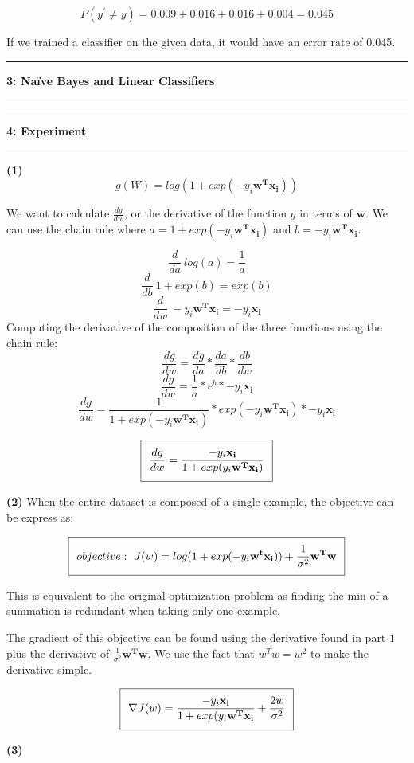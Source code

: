 \documentclass[11pt]{article}
\newcommand\question[2]{\vspace{.25in}\hrule\textbf{#1: #2}\vspace{.5em}\hrule\vspace{.10in}}
\renewcommand\part[1]{\vspace{.10in}\textbf{(#1)}}
\begin{document}
$$P(y^\prime \neq y) = 0.009 + 0.016 + 0.016 + 0.004 = 0.045$$

If we trained a classifier on the given data, it would have an error rate of 0.045.

\question{3}{Na\"{i}ve Bayes and Linear Classifiers}

\question{4}{Experiment}

\part{1} 
$$g(W) = log(1 + exp(-y_i\mathbf{w^Tx_i}))$$

We want to calculate $\frac{dg}{dw}$, or the derivative of the function $g$ in terms of $\mathbf{w}$. We can use the chain rule where $a = 1 + exp(-y_i\mathbf{w^Tx_i})$ and $b = -y_i\mathbf{w^Tx_i}$.

$$\frac{d}{da} \ log(a) = \frac{1}{a}$$
$$\frac{d}{db} \ 1 + exp(b)= exp(b)$$
$$\frac{d}{dw} \ -y_i\mathbf{w^Tx_i} = -y_i\mathbf{x_i}$$
Computing the derivative of the composition of the three functions using the chain rule:
$$\frac{dg}{dw} = \frac{dg}{da} * \frac{da}{db} * \frac{db}{dw}$$
$$\frac{dg}{dw} = \frac{1}{a} * e^b * -y_i\mathbf{x_i}$$
$$\frac{dg}{dw} = \frac{1}{1 + exp(-y_i\mathbf{w^Tx_i})} * exp(-y_i\mathbf{w^Tx_i}) * -y_i\mathbf{x_i}$$

\begin{equation}
\setlength\fboxsep{0.25cm}
\setlength\fboxrule{0.4pt}
\boxed{\frac{dg}{dw} = \frac{-y_i\mathbf{x_i}}{1 + exp(y_i\mathbf{w^Tx_i})}}
\end{equation} 

\part{2} When the entire dataset is composed of a single example, the objective can be express as:

\begin{equation}
\setlength\fboxsep{0.25cm}
\setlength\fboxrule{0.4pt}
\boxed{objective:\ J(w) = log(1 + exp(-y_i\mathbf{w^tx_i})) + \frac{1}{\sigma^2}\mathbf{w^Tw}}
\end{equation}

This is equivalent to the original optimization problem as finding the min of a summation is redundant when taking only one example.

The gradient of this objective can be found using the derivative found in part $1$ plus the derivative of $\frac{1}{\sigma^2}\mathbf{w^Tw}$. We use the fact that $w^Tw = w^2$ to make the derivative simple.

\begin{equation}
\setlength\fboxsep{0.25cm}
\setlength\fboxrule{0.4pt}
\boxed{\nabla J(w) = \frac{-y_i\mathbf{x_i}}{1 + exp(y_i\mathbf{w^Tx_i}} + \frac{2w}{\sigma^2}}
\end{equation}

\part{3}
\end{document}
